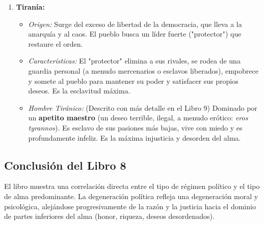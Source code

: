 \documentclass[11pt, a4paper]{article}
\begin{document}
\begin{enumerate}
    \item \textbf{Tiranía:}
        \begin{itemize}
            \item \textit{Origen:} Surge del exceso de libertad de la democracia, que lleva a la anarquía y al caos. El pueblo busca un líder fuerte ("protector") que restaure el orden.
            \item \textit{Características:} El "protector" elimina a sus rivales, se rodea de una guardia personal (a menudo mercenarios o esclavos liberados), empobrece y somete al pueblo para mantener su poder y satisfacer sus propios deseos. Es la esclavitud máxima.
            \item \textit{Hombre Tiránico:} (Descrito con más detalle en el Libro 9) Dominado por un \textbf{apetito maestro} (un deseo terrible, ilegal, a menudo erótico: \textit{eros tyrannos}). Es esclavo de sus pasiones más bajas, vive con miedo y es profundamente infeliz. Es la máxima injusticia y desorden del alma.
        \end{itemize}
\end{enumerate}

\subsection*{Conclusión del Libro 8}
El libro muestra una correlación directa entre el tipo de régimen político y el tipo de alma predominante. La degeneración política refleja una degeneración moral y psicológica, alejándose progresivamente de la razón y la justicia hacia el dominio de partes inferiores del alma (honor, riqueza, deseos desordenados).
\end{document}

